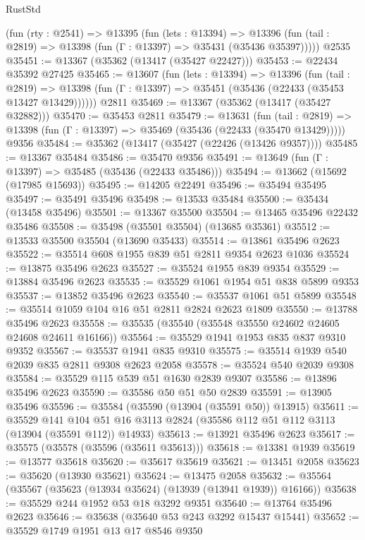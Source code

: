 \begin{lexlean}{RustStd}
\begin{coremodule}
    (fun (rty : @2541) =>
    @13395
      (fun (lets : @13394) =>
      @13396 (fun (tail : @2819) => @13398 (fun (Γ : @13397) => @35431 (@35436 @35397)))))
    @2535
@35451 := @13367 (@35362 (@13417 (@35427 @22427)))
@35453 := @22434 @35392 @27425
@35465 := @13607
    (fun (lets : @13394) =>
    @13396
      (fun (tail : @2819) =>
      @13398 (fun (Γ : @13397) => @35451 (@35436 (@22433 (@35453 @13427 @13429))))))
    @2811
@35469 := @13367 (@35362 (@13417 (@35427 @32882)))
@35470 := @35453 @2811
@35479 := @13631
    (fun (tail : @2819) => @13398 (fun (Γ : @13397) => @35469 (@35436 (@22433 (@35470 @13429)))))
    @9356
@35484 := @35362 (@13417 (@35427 (@22426 (@13426 @9357))))
@35485 := @13367 @35484
@35486 := @35470 @9356
@35491 := @13649 (fun (Γ : @13397) => @35485 (@35436 (@22433 @35486)))
@35494 := @13662 (@15692 (@17985 @15693))
@35495 := @14205 @22491
@35496 := @35494 @35495
@35497 := @35491 @35496
@35498 := @13533 @35484
@35500 := @35434 (@13458 @35496)
@35501 := @13367 @35500
@35504 := @13465 @35496 @22432 @35486
@35508 := @35498 (@35501 @35504) (@13685 @35361)
@35512 := @13533 @35500 @35504 (@13690 @35433)
@35514 := @13861 @35496 @2623
@35522 := @35514 @608 @1955 @839 @51 @2811 @9354 @2623 @1036
@35524 := @13875 @35496 @2623
@35527 := @35524 @1955 @839 @9354
@35529 := @13884 @35496 @2623
@35535 := @35529 @1061 @1954 @51 @838 @5899 @9353
@35537 := @13852 @35496 @2623
@35540 := @35537 @1061 @51 @5899
@35548 := @35514 @1059 @104 @16 @51 @2811 @2824 @2623 @1809
@35550 := @13788 @35496 @2623
@35558 := @35535 (@35540 (@35548 @35550 @24602 @24605 @24608 @24611 @16166))
@35564 := @35529 @1941 @1953 @835 @837 @9310 @9352
@35567 := @35537 @1941 @835 @9310
@35575 := @35514 @1939 @540 @2039 @835 @2811 @9308 @2623 @2058
@35578 := @35524 @540 @2039 @9308
@35584 := @35529 @115 @539 @51 @1630 @2839 @9307
@35586 := @13896 @35496 @2623
@35590 := @35586 @50 @51 @50 @2839
@35591 := @13905 @35496
@35596 := @35584 (@35590 (@13904 (@35591 @50)) @13915)
@35611 := @35529
    @141
    @104
    @51
    @16
    @3113
    @2824
    (@35586 @112 @51 @112 @3113 (@13904 (@35591 @112)) @14933)
@35613 := @13921 @35496 @2623
@35617 := @35575 (@35578 (@35596 (@35611 @35613)))
@35618 := @13381 @1939
@35619 := @13577 @35618
@35620 := @35617 @35619
@35621 := @13451 @2058
@35623 := @35620 (@13930 @35621)
@35624 := @13475 @2058
@35632 := @35564 (@35567 (@35623 (@13934 @35624) (@13939 (@13941 @1939)) @16166))
@35638 := @35529 @244 @1952 @53 @18 @3292 @9351
@35640 := @13764 @35496 @2623
@35646 := @35638 (@35640 @53 @243 @3292 @15437 @15441)
@35652 := @35529 @1749 @1951 @13 @17 @8546 @9350

\end{coremodule}
\end{lexlean}
